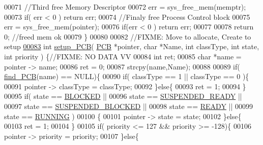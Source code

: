 \begin{DoxyCode}
00071         \textcolor{comment}{//Third free Memory Descriptor}
00072         err = sys\_free\_mem(memptr);
00073         \textcolor{keywordflow}{if}( err < 0 ) \textcolor{keywordflow}{return} err;
00074         \textcolor{comment}{//Finaly free Process Control block}
00075         err = sys\_free\_mem(pointer);
00076         \textcolor{keywordflow}{if}(err < 0 ) \textcolor{keywordflow}{return} err;
00077         
00078         \textcolor{keywordflow}{return} 0; \textcolor{comment}{//freed mem ok}
00079 \}
00080 
00082 \textcolor{comment}{//FIXME: Move to allocate, Create to setup}
\hypertarget{mpx__r2_8c_source_l00083}{}\hyperlink{mpx__r2_8h_a48d816fd79ba99118f2dff84d84395f5}{00083} \textcolor{keywordtype}{int} \hyperlink{mpx__r2_8c_a316c9619aba53c03c17afbc0a0dbf096}{setup_PCB}( \hyperlink{structprocess}{PCB} *pointer, \textcolor{keywordtype}{char} *Name, \textcolor{keywordtype}{int} classType, \textcolor{keywordtype}{int} state, \textcolor{keywordtype}{int} priority )
      \{\textcolor{comment}{//FIXME: NO DATA VV}
00084         \textcolor{keywordtype}{int} ret;
00085         \textcolor{keywordtype}{char} *name = pointer -> name;
00086         ret = 0;
00087         strcpy(name,Name);
00088         
00089         \textcolor{keywordflow}{if}( \hyperlink{mpx__r2_8c_a612a6abcb66c688a32f33abc93ff3990}{find_PCB}(name) == NULL)\{
00090                 \textcolor{keywordflow}{if}( classType == 1 || classType == 0 )\{
00091                         pointer -> classType = classType;
00092                 \}\textcolor{keywordflow}{else}\{
00093                         ret = 1;
00094                 \}
00095                  \textcolor{keywordflow}{if}( state == \hyperlink{mpx__r2_8h_a48f6457243719e7031768d4100741159}{BLOCKED} || 
00096                          state == \hyperlink{mpx__r2_8h_a07b1141143e8825b04670da23fca8cc7}{SUSPENDED_READY} || 
00097                      state == \hyperlink{mpx__r2_8h_a6e41bb5a80c5049e8d364bab8ee4d73a}{SUSPENDED_BLOCKED} ||
00098                          state == \hyperlink{mpx__r2_8h_ad1235d5ce36f7267285e82dccd428aa6}{READY} || 
00099                          state == \hyperlink{mpx__r2_8h_a6fb7181d994ee98e735494be55809708}{RUNNING} )
00100                 \{
00101                 pointer -> state = state;
00102                 \}\textcolor{keywordflow}{else}\{
00103                         ret = 1;
00104                 \}
00105                 \textcolor{keywordflow}{if}( priority <= 127 && priority >= -128)\{
00106                         pointer -> priority = priority;
00107                 \}\textcolor{keywordflow}{else}\{

\end{DoxyCode}
